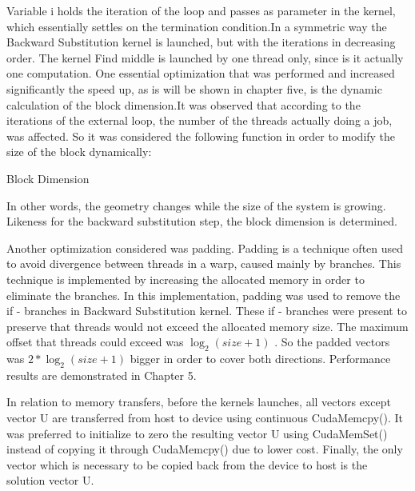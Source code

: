 Variable i holds the iteration of the loop and passes as parameter in the kernel, which essentially settles on the termination condition.In a symmetric way the  Backward Substitution kernel is launched, but with the iterations in decreasing order.
The kernel Find middle is launched by one thread only, since is it actually one computation.
One essential optimization that was performed and increased significantly the speed up, as is will be shown in chapter five, is the dynamic calculation of the block dimension.It was observed that according to the iterations of the external loop, the number of the threads actually doing a job, was affected. So it was considered the following function in order to modify the size of the block dynamically:
\begin{algorithm}[H]
\begin{algorithmic}[1]
\EndFunction
\end{algorithmic}
\caption{Block Dimension}
\label{alg:calc_dim}
\end{algorithm}
In other words, the geometry changes while the size of the system is growing. 
Likeness for the backward substitution step, the block dimension is determined.

Another optimization considered was padding. Padding is a technique often used to avoid divergence between threads in a warp, caused mainly by branches. This technique is implemented by increasing the allocated memory in order to eliminate the branches.
In this implementation, padding was used to remove the if - branches in Backward Substitution kernel. These if - branches were present to preserve that threads would not exceed the allocated memory size. The maximum offset that threads could exceed was $\log_2(size+1)$ . So the padded vectors was $2*\log_2(size+1)$ bigger in order to cover both directions.
Performance results are demonstrated in Chapter 5.

In relation to memory transfers, before the kernels launches, all vectors except vector U are transferred from host to device using continuous CudaMemcpy(). It was preferred to initialize to zero the resulting vector U using CudaMemSet() instead of copying it through CudaMemcpy() due to lower cost. Finally, the only vector which is necessary to be copied back from the device to host is the solution vector U.
